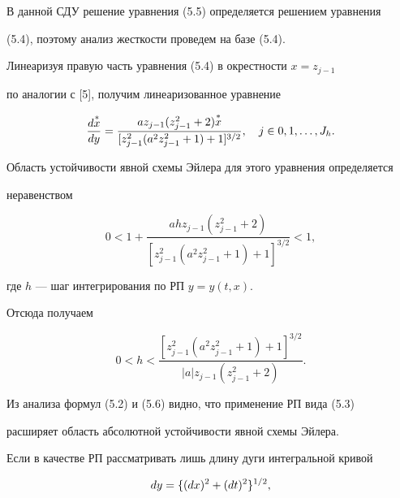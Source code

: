  


В данной СДУ решение уравнения (5.5) определяется решением уравнения 


(5.4), поэтому анализ жесткости проведем на базе (5.4). 


Линеаризуя правую часть уравнения (5.4) в окрестности $x=z_{j-1}$ 


по аналогии с [5], получим линеаризованное уравнение 


$$ 


\frac{d\up{*}{x}}{dy}=\frac{a z_{j-1}(z^2_{j-1}+2)\up{*}{x}} 


{[z^2_{j-1}(a^2z^2_{j-1}+1)+1]^{3/2}},\quad j\in 0,1,\dotsc,J_h. 


$$ 


 


Область устойчивости явной схемы Эйлера для этого уравнения определяется 


неравенством 


$$ 


0<1+\frac{a h z_{j-1}(z^2_{j-1}+2)} 


{[z^2_{j-1}(a^2z^2_{j-1}+1)+1]^{3/2}}<1, 


$$ 


где $h$ --- шаг интегрирования по РП $y=y(t,x)$. 


Отсюда получаем 


\begin{equation} 


0<h<\frac{[z^2_{j-1}(a^2z^2_{j-1}+1)+1]^{3/2}} 


{|a|z_{j-1}(z^2_{j-1}+2)}. 


\end{equation} 


 


Из анализа формул (5.2) и (5.6) видно, что применение РП вида (5.3) 


расширяет область абсолютной устойчивости явной схемы Эйлера. 


 


Если в качестве РП рассматривать лишь длину дуги интегральной кривой 


\begin{gather} 


dy=\{(dx)^2+(dt)^2\}^{1/2}, \\


\ \notag


\end{gather} 


